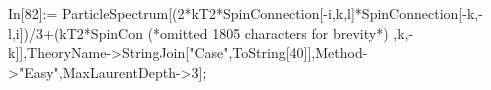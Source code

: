 In[82]:= ParticleSpectrum[(2*kT2*SpinConnection[-i,k,l]*SpinConnection[-k,-l,i])/3+(kT2*SpinCon (*omitted 1805 characters for brevity*) ,k,-k]],TheoryName->StringJoin["Case",ToString[40]],Method->"Easy",MaxLaurentDepth->3];
